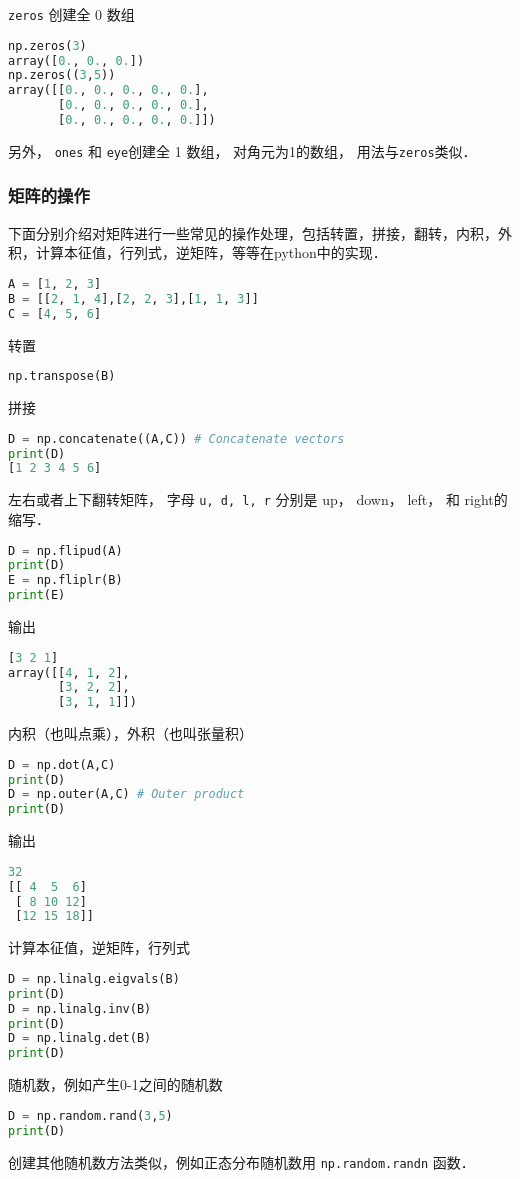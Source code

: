 \verb|zeros| 创建全 0 数组
\begin{lstlisting}[language=python]
np.zeros(3)
array([0., 0., 0.])
np.zeros((3,5))
array([[0., 0., 0., 0., 0.],
       [0., 0., 0., 0., 0.],
       [0., 0., 0., 0., 0.]])
\end{lstlisting} 
另外， \verb|ones| 和 \verb|eye|创建全 1 数组， 对角元为1的数组， 用法与\verb|zeros|类似．

\subsubsection{矩阵的操作}
下面分别介绍对矩阵进行一些常见的操作处理，包括转置，拼接，翻转，内积，外积，计算本征值，行列式，逆矩阵，等等在python中的实现．
\begin{lstlisting}[language=python]
A = [1, 2, 3]
B = [[2, 1, 4],[2, 2, 3],[1, 1, 3]]
C = [4, 5, 6]
\end{lstlisting}
转置
\begin{lstlisting}[language=python]
np.transpose(B)
\end{lstlisting}
拼接
\begin{lstlisting}[language=python]
D = np.concatenate((A,C)) # Concatenate vectors
print(D)
[1 2 3 4 5 6]
\end{lstlisting}
左右或者上下翻转矩阵， 字母 \verb|u, d, l, r| 分别是 up， down，  left， 和  right的缩写．
\begin{lstlisting}[language=python]
D = np.flipud(A) 
print(D)
E = np.fliplr(B) 
print(E)
\end{lstlisting}
输出
\begin{lstlisting}[language=python]
[3 2 1]
array([[4, 1, 2],
       [3, 2, 2],
       [3, 1, 1]])
\end{lstlisting}
内积（也叫点乘），外积（也叫张量积）
\begin{lstlisting}[language=python]
D = np.dot(A,C) 
print(D)
D = np.outer(A,C) # Outer product
print(D)
\end{lstlisting}
输出
\begin{lstlisting}[language=python]
32
[[ 4  5  6]
 [ 8 10 12]
 [12 15 18]]
\end{lstlisting}
计算本征值，逆矩阵，行列式
\begin{lstlisting}[language=python]
D = np.linalg.eigvals(B) 
print(D)
D = np.linalg.inv(B)
print(D)
D = np.linalg.det(B)
print(D)
\end{lstlisting}
随机数，例如产生0-1之间的随机数
\begin{lstlisting}[language=python]
D = np.random.rand(3,5) 
print(D)
\end{lstlisting}
创建其他随机数方法类似，例如正态分布随机数用 \verb|np.random.randn| 函数．
